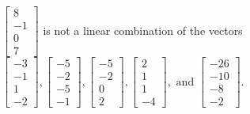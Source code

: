 \begin{exercise}
\begin{exerciseStatement}
  \end{exerciseStatement}
  \begin{exerciseAnswer}
   \(\left[\begin{array}{c}
8 \\
-1 \\
0 \\
7
\end{array}\right]\) 
  	 is not  
	a linear combination of the vectors \(\left[\begin{array}{c}
-3 \\
-1 \\
1 \\
-2
\end{array}\right] , \left[\begin{array}{c}
-5 \\
-2 \\
-5 \\
-1
\end{array}\right] , \left[\begin{array}{c}
-5 \\
-2 \\
0 \\
2
\end{array}\right] , \left[\begin{array}{c}
2 \\
1 \\
1 \\
-4
\end{array}\right] , \text{ and } \left[\begin{array}{c}
-26 \\
-10 \\
-8 \\
-2
\end{array}\right]\).

	
  


  \end{exerciseAnswer}
\end{exercise}